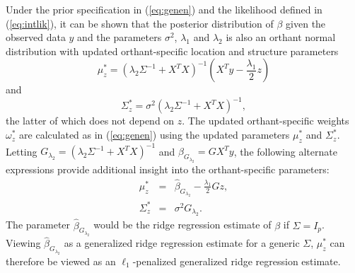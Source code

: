 \documentclass[12pt]{article}
\begin{document}
Under the prior specification in (\ref{eq:genen}) and the likelihood defined in (\ref{eq:intlik}), 
it can be shown that the posterior distribution of $\beta$ given the observed data $y$ and the 
parameters $\sigma^2$, $\lambda_1$ and $\lambda_2$ is also an orthant normal distribution with 
updated orthant-specific location and structure parameters
\begin{equation}
	\mu_z^* = (\lambda_2 \Sigma^{-1} + X^TX)^{-1} \left(X^T y - \frac{\lambda_1}{2}z\right) 
	\label{eq:genpostmu}
\end{equation}
and
\begin{equation}
	\Sigma^*_z = \sigma^2 (\lambda_2 \Sigma^{-1} + X^TX)^{-1},
	\label{eq:genpostsig}
\end{equation}
the latter of which does not depend on $z$. The updated
orthant-specific weights $\omega^*_z$ are calculated as in (\ref{eq:genen}) using the updated 
parameters $\mu_z^*$ and $\Sigma_z^*$. Letting $G_{\lambda_2} = (\lambda_2 \Sigma^{-1} + 
X^TX)^{-1}$ and $\hat{\beta}_{G_{\lambda_2}} = G X^T y$, the following alternate expressions provide 
additional insight into the orthant-specific parameters:
\begin{eqnarray*}
	\mu_z^* &=& \hat{\beta}_{G_{\lambda_2}} - \frac{\lambda_1}{2}G z, \\
	\Sigma_z^* &=& \sigma^2 G_{\lambda_2}.
\end{eqnarray*}
The parameter $\hat{\beta}_{G_{\lambda_2}}$ would be the ridge regression estimate of $\beta$ if
$\Sigma = I_p$. Viewing $\hat{\beta}_{G_{\lambda_2}}$ as a generalized ridge regression 
estimate for a generic $\Sigma$, $\mu^*_z$ can therefore be viewed as an $\ell_1$-penalized
generalized ridge regression estimate.
\end{document}
